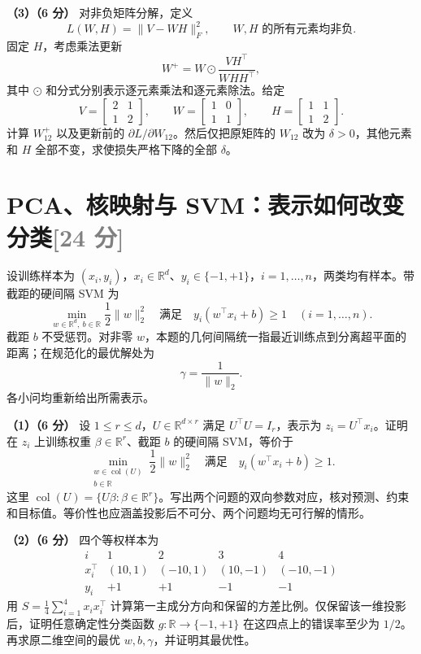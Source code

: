 \documentclass[11pt,a4paper]{article}
\newcommand{\R}{\mathbb R}
\newcommand{\col}{\operatorname{col}}
\newcommand{\partq}[2]{\par\Needspace{6\baselineskip}\noindent\textbf{（#1）（#2 分）}}
\begin{document}
\partq{3}{6} 对非负矩阵分解，定义
\[
L(W,H)=\|V-WH\|_F^2,\qquad W,H\text{ 的所有元素均非负}.
\]
固定 $H$，考虑乘法更新
\[
W^+=W\odot\frac{VH^\top}{WHH^\top},
\]
其中 $\odot$ 和分式分别表示逐元素乘法和逐元素除法。给定
\[
V=\begin{bmatrix}2&1\\1&2\end{bmatrix},\qquad
W=\begin{bmatrix}1&0\\1&1\end{bmatrix},\qquad
H=\begin{bmatrix}1&1\\1&2\end{bmatrix}.
\]
计算 $W_{12}^+$ 以及更新前的 $\partial L/\partial W_{12}$。然后仅把原矩阵的 $W_{12}$ 改为 $\delta>0$，其他元素和 $H$ 全部不变，求使损失严格下降的全部 $\delta$。

\clearpage
\section[PCA、核映射与 SVM]{PCA、核映射与 SVM：表示如何改变分类\hfill\textcolor{gray}{[24 分]}}
设训练样本为 $(x_i,y_i)$，$x_i\in\R^d$、$y_i\in\{-1,+1\}$，$i=1,\ldots,n$，两类均有样本。带截距的硬间隔 SVM 为
\[
\min_{w\in\R^d,\ b\in\R}\frac12\|w\|_2^2
\quad\text{满足}\quad
y_i(w^\top x_i+b)\geq1\quad(i=1,\ldots,n).
\]
截距 $b$ 不受惩罚。对非零 $w$，本题的几何间隔统一指最近训练点到分离超平面的距离；在规范化的最优解处为
\[
\gamma=\frac1{\|w\|_2}.
\]
各小问均重新给出所需表示。

\partq{1}{6} 设 $1\leq r\leq d$，$U\in\R^{d\times r}$ 满足 $U^\top U=I_r$，表示为 $z_i=U^\top x_i$。证明在 $z_i$ 上训练权重 $\beta\in\R^r$、截距 $b$ 的硬间隔 SVM，等价于
\[
\min_{\substack{w\in\col(U)\\b\in\R}}\frac12\|w\|_2^2
\quad\text{满足}\quad y_i(w^\top x_i+b)\geq1.
\]
这里 $\col(U)=\{U\beta:\beta\in\R^r\}$。写出两个问题的双向参数对应，核对预测、约束和目标值。等价性也应涵盖投影后不可分、两个问题均无可行解的情形。

\partq{2}{6} 四个等权样本为
\[
\begin{array}{c|rrrr}
i&1&2&3&4\\\hline
x_i^\top&(10,1)&(-10,1)&(10,-1)&(-10,-1)\\
y_i&+1&+1&-1&-1
\end{array}
\]
用 $S=\frac14\sum_{i=1}^4 x_i x_i^\top$ 计算第一主成分方向和保留的方差比例。仅保留该一维投影后，证明任意确定性分类函数 $g:\R\to\{-1,+1\}$ 在这四点上的错误率至少为 $1/2$。再求原二维空间的最优 $w,b,\gamma$，并证明其最优性。
\end{document}
